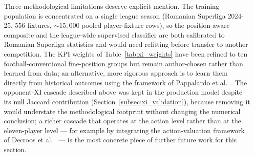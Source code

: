 Three methodological limitations deserve explicit mention. The training population is concentrated on a single league season (Romanian Superliga 2024-25, $556$ fixtures, $\sim 15{,}000$ pooled player-fixture rows), so the position-aware composite and the league-wide supervised classifier are both calibrated to Romanian Superliga statistics and would need refitting before transfer to another competition. The KPI weights of Table~\ref{tab:xi_weights} have been refined to ten football-conventional fine-position groups but remain author-chosen rather than learned from data; an alternative, more rigorous approach is to learn them directly from historical outcomes using the framework of Pappalardo et al.~\cite{pappalardo2019playerank}. The opponent-XI cascade described above was kept in the production model despite its null Jaccard contribution (Section~\ref{subsec:xi_validation}), because removing it would understate the methodological footprint without changing the numerical conclusion; a richer cascade that operates at the action level rather than at the eleven-player level --- for example by integrating the action-valuation framework of Decroos et al.~\cite{decroos2019vaep} --- is the most concrete piece of further future work for this section.

